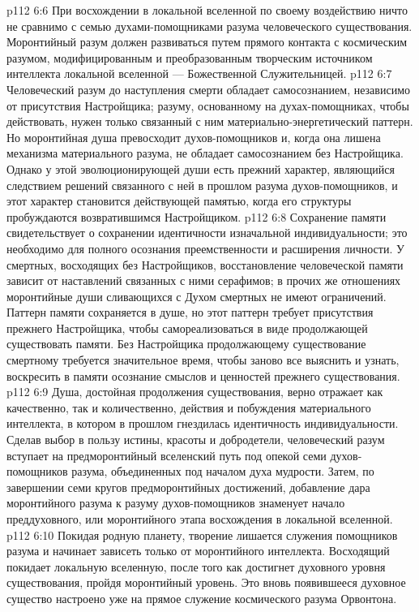 \vs p112 6:6 При восхождении в локальной вселенной по своему воздействию ничто не сравнимо с семью духами\hyp{}помощниками разума человеческого существования. Моронтийный разум должен развиваться путем прямого контакта с космическим разумом, модифицированным и преобразованным творческим источником интеллекта локальной вселенной --- Божественной Служительницей.
\vs p112 6:7 \pc Человеческий разум до наступления смерти обладает самосознанием, независимо от присутствия Настройщика; разуму, основанному на духах\hyp{}помощниках, чтобы действовать, нужен только связанный с ним материально\hyp{}энергетический паттерн. Но моронтийная душа превосходит духов\hyp{}помощников и, когда она лишена механизма материального разума, не обладает самосознанием без Настройщика. Однако у этой эволюционирующей души есть прежний характер, являющийся следствием решений связанного с ней в прошлом разума духов\hyp{}помощников, и этот характер становится действующей памятью, когда его структуры пробуждаются возвратившимся Настройщиком.
\vs p112 6:8 Сохранение памяти свидетельствует о сохранении идентичности изначальной индивидуальности; это необходимо для полного осознания преемственности и расширения личности. У смертных, восходящих без Настройщиков, восстановление человеческой памяти зависит от наставлений связанных с ними серафимов; в прочих же отношениях моронтийные души сливающихся с Духом смертных не имеют ограничений. Паттерн памяти сохраняется в душе, но этот паттерн требует присутствия прежнего Настройщика, чтобы  самореализоваться в виде продолжающей существовать памяти. Без Настройщика продолжающему существование смертному требуется значительное время, чтобы заново все выяснить и узнать, воскресить в памяти осознание смыслов и ценностей прежнего существования.
\vs p112 6:9 Душа, достойная продолжения существования, верно отражает как качественно, так и количественно, действия и побуждения материального интеллекта, в котором в прошлом гнездилась идентичность индивидуальности. Сделав выбор в пользу истины, красоты и добродетели, человеческий разум вступает на предморонтийный вселенский путь под опекой семи духов\hyp{}помощников разума, объединенных под началом духа мудрости. Затем, по завершении семи кругов предморонтийных достижений, добавление дара моронтийного разума к разуму духов\hyp{}помощников знаменует начало преддуховного, или моронтийного этапа восхождения в локальной вселенной.
\vs p112 6:10 \pc Покидая родную планету, творение лишается служения помощников разума и начинает зависеть только от моронтийного интеллекта. Восходящий покидает локальную вселенную, после того как достигнет духовного уровня существования, пройдя моронтийный уровень. Это вновь появившееся духовное существо настроено уже на прямое служение космического разума Орвонтона.
